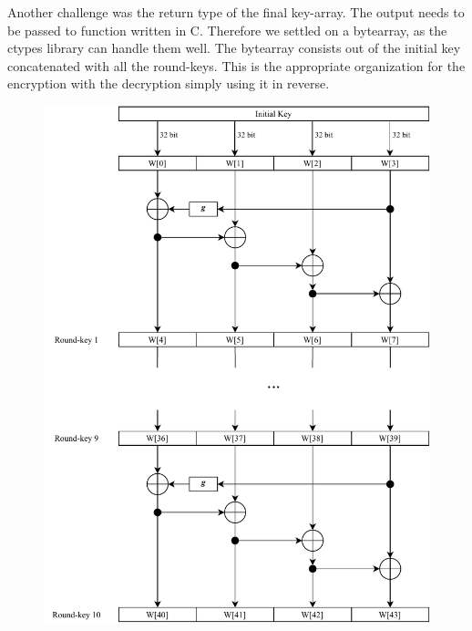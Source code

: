 Another challenge was the return type of the final key-array. The output needs to be passed to function written in C. Therefore we settled on a bytearray, as the ctypes library can handle them well. The bytearray consists out of the initial key concatenated with all the round-keys. This is the appropriate organization for the encryption with the decryption simply using it in reverse.

\begin{figure}
\centering
  \begin{minipage}{.65\textwidth}
    \centering
    \includegraphics[width=\linewidth]{data/assets/key_expansion.pdf}
  \end{minipage}%
  \begin{minipage}{.35\textwidth}

\end{minipage}
\end{figure}
